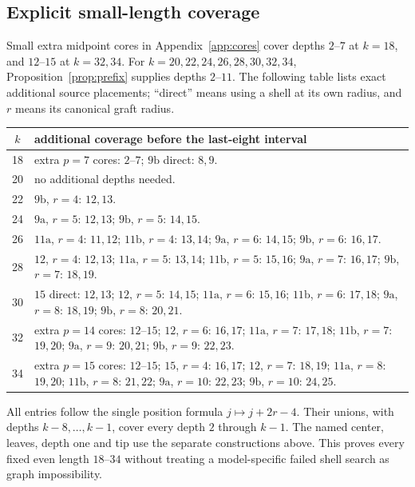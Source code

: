 \documentclass[11pt,a4paper]{article}
\theoremstyle{definition}\newtheorem{definition}[theorem]{Definition}
\theoremstyle{remark}\newtheorem{remark}[theorem]{Remark}
\begin{document}
\subsection{Explicit small-length coverage}
Small extra midpoint cores in Appendix~\ref{app:cores} cover depths
$2$--$7$ at $k=18$, and $12$--$15$ at $k=32,34$.
For $k=20,22,24,26,28,30,32,34$, Proposition~\ref{prop:prefix}
supplies depths $2$--$11$. The following table lists exact additional
source placements; ``direct'' means using a shell at its own radius,
and $r$ means its canonical graft radius.
\begin{center}\begin{tabular}{c p{105mm}}\toprule
$k$ & additional coverage before the last-eight interval\\\midrule
18 & extra $p=7$ cores: $2$--$7$; $9\mathrm b$ direct: $8,9$.\\
20 & no additional depths needed.\\
22 & $9\mathrm b$, $r=4$: $12,13$.\\
24 & $9\mathrm a$, $r=5$: $12,13$; $9\mathrm b$, $r=5$: $14,15$.\\
26 & $11\mathrm a$, $r=4$: $11,12$; $11\mathrm b$, $r=4$: $13,14$;
      $9\mathrm a$, $r=6$: $14,15$; $9\mathrm b$, $r=6$: $16,17$.\\
28 & $12$, $r=4$: $12,13$; $11\mathrm a$, $r=5$: $13,14$;
      $11\mathrm b$, $r=5$: $15,16$; $9\mathrm a$, $r=7$: $16,17$;
      $9\mathrm b$, $r=7$: $18,19$.\\
30 & $15$ direct: $12,13$; $12$, $r=5$: $14,15$;
      $11\mathrm a$, $r=6$: $15,16$; $11\mathrm b$, $r=6$: $17,18$;
      $9\mathrm a$, $r=8$: $18,19$; $9\mathrm b$, $r=8$: $20,21$.\\
32 & extra $p=14$ cores: $12$--$15$; $12$, $r=6$: $16,17$;
      $11\mathrm a$, $r=7$: $17,18$; $11\mathrm b$, $r=7$: $19,20$;
      $9\mathrm a$, $r=9$: $20,21$; $9\mathrm b$, $r=9$: $22,23$.\\
34 & extra $p=15$ cores: $12$--$15$; $15$, $r=4$: $16,17$;
      $12$, $r=7$: $18,19$; $11\mathrm a$, $r=8$: $19,20$;
      $11\mathrm b$, $r=8$: $21,22$; $9\mathrm a$, $r=10$: $22,23$;
      $9\mathrm b$, $r=10$: $24,25$.\\\bottomrule
\end{tabular}\end{center}
All entries follow the single position formula $j\mapsto j+2r-4$.
Their unions, with depths $k-8,\ldots,k-1$, cover every depth $2$ through
$k-1$. The named center, leaves, depth one and tip use the separate
constructions above. This proves every fixed even length $18$--$34$
without treating a model-specific failed shell search as graph impossibility.
\end{document}
